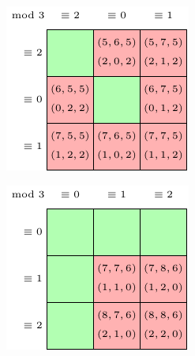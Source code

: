 \begin{table}[]
\centering
\begin{subfigure}{0.3\textwidth}
	\includegraphics[width=\textwidth]{tables/4/residue_2.pdf}
	\label{tab:r_a}
\end{subfigure} \hfill%
\begin{subfigure}{0.3\textwidth}
	\includegraphics[width=\textwidth]{tables/4/residue_0.pdf}

\end{subfigure}
\end{table}
